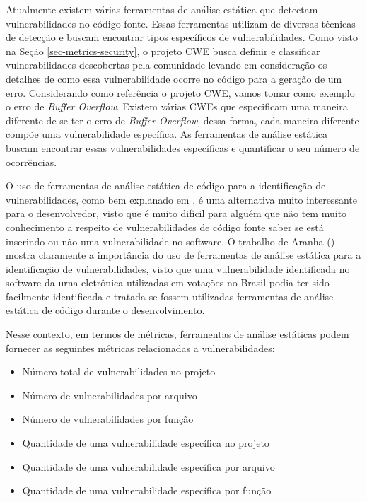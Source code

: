 Atualmente existem várias ferramentas de análise estática que detectam vulnerabilidades no código fonte. Essas ferramentas utilizam de diversas técnicas de detecção e buscam encontrar tipos específicos de vulnerabilidades. Como visto na Seção \ref{sec-metrics-security}, o projeto CWE busca definir  e classificar vulnerabilidades descobertas pela comunidade levando em consideração os detalhes de como essa vulnerabilidade ocorre no código para a geração de um erro. Considerando como referência o projeto CWE, vamos tomar como exemplo o erro de \emph{Buffer Overflow}. Existem várias CWEs que especificam uma maneira diferente de se ter o erro de \emph{Buffer Overflow}, dessa forma, cada maneira diferente compõe uma vulnerabilidade específica. As ferramentas de análise estática buscam  encontrar essas vulnerabilidades específicas e quantificar o seu número de ocorrências. 

O uso de ferramentas de análise estática de código para a identificação de vulnerabilidades, como bem explanado em \cite{chess2007}, é uma alternativa muito interessante para o desenvolvedor, visto que é muito difícil para alguém que não tem muito conhecimento a respeito de vulnerabilidades de código fonte saber se está inserindo ou não uma vulnerabilidade no software. O trabalho de Aranha (\citeyear{aranha2012}) mostra claramente a importância do uso de ferramentas de análise estática para a identificação de vulnerabilidades, visto que uma vulnerabilidade identificada no software da urna eletrônica utilizadas em votações no Brasil podia ter sido facilmente identificada e tratada se fossem utilizadas ferramentas de análise estática de código durante o desenvolvimento.

%

Nesse contexto, em termos de métricas, ferramentas de análise estáticas podem fornecer as seguintes métricas relacionadas a vulnerabilidades:

\begin{itemize}
\item Número total de vulnerabilidades no projeto
\item Número de vulnerabilidades por arquivo
\item Número de vulnerabilidades por função
\item Quantidade de uma vulnerabilidade específica no projeto
\item Quantidade de uma vulnerabilidade específica por arquivo
\item Quantidade de uma vulnerabilidade específica por função
\end{itemize}


